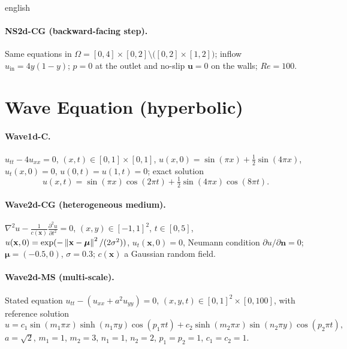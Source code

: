 \documentclass[../0000.tex]{subfiles}
\begin{document}
\begin{hyphenrules}{english}
\paragraph{NS2d-CG (backward-facing step).} Same equations in
$\Omega=[0,4]\times[0,2]\setminus\big([0,2]\times[1,2]\big)$; inflow $u_{\mathrm{in}}=4y(1-y)$; $p=0$ at the
outlet and no-slip $\mathbf{u}=0$ on the walls; $Re=100$.

\section{Wave Equation (hyperbolic)}
\paragraph{Wave1d-C.} $u_{tt}-4u_{xx}=0$, $(x,t)\in[0,1]\times[0,1]$,
$u(x,0)=\sin(\pi x)+\frac12\sin(4\pi x)$, $u_t(x,0)=0$, $u(0,t)=u(1,t)=0$; exact solution
\[
  u(x,t)=\sin(\pi x)\cos(2\pi t)+\tfrac12\sin(4\pi x)\cos(8\pi t).
\]

\paragraph{Wave2d-CG (heterogeneous medium).} $\nabla^2u-\frac{1}{c(\mathbf{x})}\frac{\partial^2u}{\partial t^2}=0$,
$(x,y)\in[-1,1]^2$, $t\in[0,5]$, $u(\mathbf{x},0)=\exp(-\left\lVert \mathbf{x}-\bm\mu \right\rVert^2/(2\sigma^2))$, $u_t(\mathbf{x},0)=0$, Neumann
condition $\partial u/\partial\mathbf{n}=0$; $\bm\mu=(-0.5,0)$, $\sigma=0.3$; $c(\mathbf{x})$ a Gaussian random field.

\paragraph{Wave2d-MS (multi-scale).} Stated equation $u_{tt}-(u_{xx}+a^2u_{yy})=0$,
$(x,y,t)\in[0,1]^2\times[0,100]$, with reference solution
\[
  u=c_1\sin(m_1\pi x)\sinh(n_1\pi y)\cos(p_1\pi t)+c_2\sinh(m_2\pi x)\sin(n_2\pi y)\cos(p_2\pi t),
\]
$a=\sqrt2$, $m_1=1$, $m_2=3$, $n_1=1$, $n_2=2$, $p_1=p_2=1$, $c_1=c_2=1$.


\end{hyphenrules}
\end{document}
